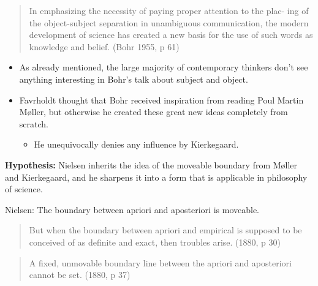 \documentclass[ignorenonframetext, ]{beamer}
\begin{document}
\begin{frame}

\begin{quote}
  In emphasizing the necessity of paying proper attention to the plac-
  ing of the object-subject separation in unambiguous communication,
  the modern development of science has created a new basis for the
  use of such words as knowledge and belief. (Bohr 1955, p 61)
\end{quote}
\end{frame}


\begin{frame}


  \begin{itemize}
  \item As already mentioned, the large majority of contemporary
    thinkers don't see anything interesting in Bohr's talk about
    subject and object.
  \item Favrholdt thought that Bohr received inspiration from reading
    Poul Martin Møller, but otherwise he created these great new ideas
    completely from scratch.
    \begin{itemize}
    \item He unequivocally denies any influence by
      Kierkegaard. \end{itemize}
  \end{itemize}


\end{frame}

\begin{frame}

  {\large \textbf{Hypothesis:} Nielsen inherits the idea of the
    moveable boundary from Møller and Kierkegaard, and he sharpens it
    into a form that is applicable in philosophy of science.}


\end{frame}

\begin{frame}

  Nielsen: The boundary between apriori and aposteriori is moveable.

  \medskip \begin{quote} But when the boundary between apriori and
    empirical is supposed to be conceived of as definite and exact,
    then troubles arise. (1880, p 30)
\end{quote}

\medskip \begin{quote}
  A fixed, unmovable boundary line between the apriori and aposteriori
  cannot be set. (1880, p 37)
\end{quote}
\end{frame}
\end{document}
